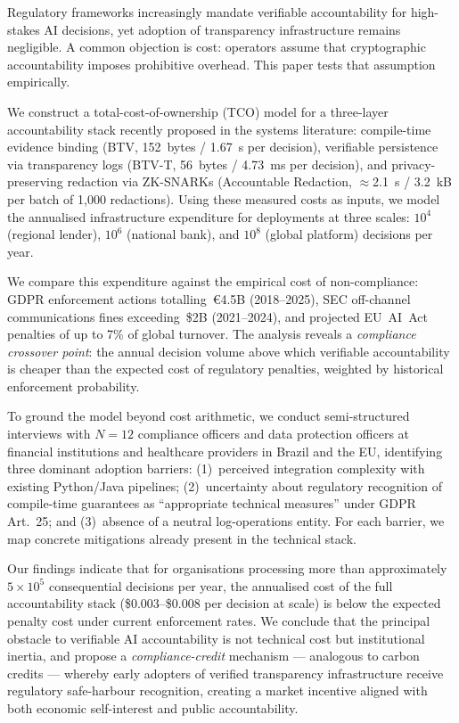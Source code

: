Regulatory frameworks increasingly mandate verifiable accountability for
high-stakes AI decisions, yet adoption of transparency infrastructure
remains negligible. A common objection is cost: operators assume that
cryptographic accountability imposes prohibitive overhead. This paper
tests that assumption empirically.

We construct a total-cost-of-ownership (TCO) model for a three-layer
accountability stack recently proposed in the systems literature:
compile-time evidence binding (BTV, 152~bytes / 1.67~\textmu{}s per
decision), verifiable persistence via transparency logs (BTV-T,
56~bytes / 4.73~ms per decision), and privacy-preserving redaction
via ZK-SNARKs (Accountable Redaction, $\approx$2.1~s / 3.2~kB per
batch of 1{,}000 redactions). Using these measured costs as inputs, we
model the annualised infrastructure expenditure for deployments at
three scales: $10^4$ (regional lender), $10^6$ (national bank), and
$10^8$ (global platform) decisions per year.

We compare this expenditure against the empirical cost of
non-compliance: GDPR enforcement actions totalling~\euro{}4.5B
(2018--2025), SEC off-channel communications fines exceeding~\$2B
(2021--2024), and projected EU~AI~Act penalties of up to 7\% of
global turnover. The analysis reveals a \emph{compliance crossover
point}: the annual decision volume above which verifiable
accountability is cheaper than the expected cost of regulatory
penalties, weighted by historical enforcement probability.

To ground the model beyond cost arithmetic, we conduct semi-structured
interviews with $N=12$ compliance officers and data protection officers
at financial institutions and healthcare providers in Brazil and the EU,
identifying three dominant adoption barriers: (1)~perceived integration
complexity with existing Python/Java pipelines; (2)~uncertainty about
regulatory recognition of compile-time guarantees as ``appropriate
technical measures'' under GDPR Art.~25; and (3)~absence of a neutral
log-operations entity. For each barrier, we map concrete mitigations
already present in the technical stack.

Our findings indicate that for organisations processing more than
approximately $5 \times 10^5$ consequential decisions per year, the
annualised cost of the full accountability stack (\$0.003--\$0.008 per
decision at scale) is below the expected penalty cost under current
enforcement rates. We conclude that the principal obstacle to
verifiable AI accountability is not technical cost but institutional
inertia, and propose a \emph{compliance-credit} mechanism --- analogous
to carbon credits --- whereby early adopters of verified transparency
infrastructure receive regulatory safe-harbour recognition, creating a
market incentive aligned with both economic self-interest and public
accountability.
